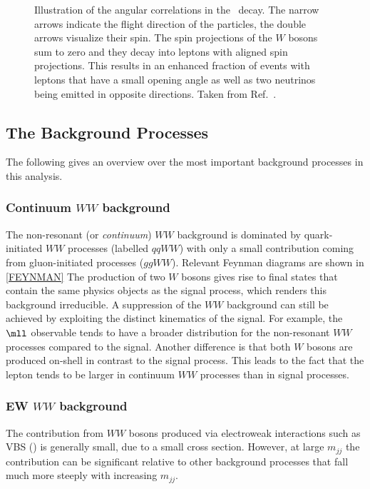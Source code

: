 \begin{figure}
    \caption[Angular correlations in the \HWWdet\ decay.]{Illustration of the angular correlations in the \HWWdet\ decay. The narrow arrows indicate the flight direction of the particles, the double arrows visualize their spin. The spin projections of the $W$ bosons sum to zero and they decay into leptons with aligned spin projections. This results in an enhanced fraction of events with leptons that have a small opening angle as well as two neutrinos being emitted in opposite directions. Taken from Ref.~\cite{PhysRevD.92.012006}.}
    \label{fig:spin-correlations}
\end{figure}

\subsection{The Background Processes}
The following gives an overview over the most important background processes in this analysis.

\subsubsection{Continuum $WW$ background}
The non-resonant (or \emph{continuum}) $WW$ background is dominated by quark-initiated $WW$ processes (labelled $qqWW$) with only a small contribution coming from gluon-initiated processes ($ggWW$). 
Relevant Feynman diagrams are shown in \cref{FEYNMAN}
The production of two $W$ bosons gives rise to final states that contain the same physics objects as the signal process, which renders this background irreducible. 
A suppression of the $WW$ background can still be achieved by exploiting the distinct kinematics of the signal. For example, the $\mll$ observable tends to have a broader distribution for the non-resonant $WW$ processes compared to the signal. 
Another difference is that both $W$ bosons are produced on-shell in contrast to the signal process. 
This leads to the fact that the lepton \pT tends to be larger in continuum $WW$ processes than in signal processes.

\subsubsection{EW $WW$ background}
The contribution from $WW$ bosons produced via electroweak interactions such as VBS () is generally small, due to a small cross section. However, at large $m_{jj}$ the contribution can be significant relative to other background processes that fall much more steeply with increasing $m_{jj}$. 

